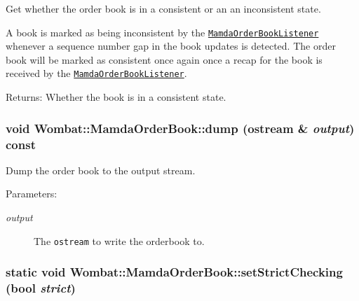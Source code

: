 Get whether the order book is in a consistent or an an inconsistent state. 

A book is marked as being inconsistent by the {\tt \hyperlink{classWombat_1_1MamdaOrderBookListener}{Mamda\-Order\-Book\-Listener}} whenever a sequence number gap in the book updates is detected. The order book will be marked as consistent once again once a recap for the book is received by the {\tt \hyperlink{classWombat_1_1MamdaOrderBookListener}{Mamda\-Order\-Book\-Listener}}.

\begin{Desc}
\item[Returns:]Whether the book is in a consistent state. \end{Desc}
\hypertarget{classWombat_1_1MamdaOrderBook_08e81be1a8c8751b353e20b7b2747e24}{
\subsubsection[dump]{\setlength{\rightskip}{0pt plus 5cm}void Wombat::Mamda\-Order\-Book::dump (ostream \& {\em output}) const}}
\label{classWombat_1_1MamdaOrderBook_08e81be1a8c8751b353e20b7b2747e24}


Dump the order book to the output stream. 

\begin{Desc}
\item[Parameters:]
\begin{description}
\item[{\em output}]The {\tt ostream} to write the orderbook to. \end{description}
\end{Desc}
\hypertarget{classWombat_1_1MamdaOrderBook_469f47b99322ce6b9e002429a75a8efd}{
\subsubsection[setStrictChecking]{\setlength{\rightskip}{0pt plus 5cm}static void Wombat::Mamda\-Order\-Book::set\-Strict\-Checking (bool {\em strict})}}
\label{classWombat_1_1MamdaOrderBook_469f47b99322ce6b9e002429a75a8efd}


